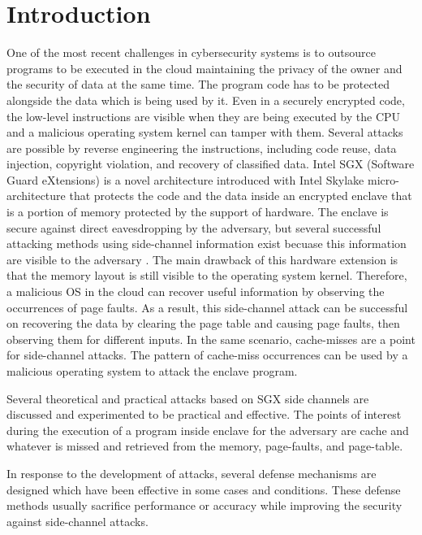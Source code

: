 \section{Introduction}

One of the most recent challenges in cybersecurity systems is to outsource programs to be executed in the cloud maintaining the privacy of the owner and the security of data at the same time. The program code has to be protected alongside the data which is being used by it. Even in a securely encrypted code, the low-level instructions are visible when they are being executed by the CPU and a malicious operating system kernel can tamper with them. Several attacks are possible by reverse engineering the instructions, including code reuse, data injection, copyright violation, and recovery of classified data. Intel SGX (Software Guard eXtensions) \cite{sgx} is a novel architecture introduced with Intel Skylake micro-architecture \cite{skylake} that protects the code and the data inside an encrypted enclave that is a portion of memory protected by the support of hardware. The enclave is secure against direct eavesdropping by the adversary, but several successful attacking methods using side-channel information exist becuase  this information are visible to the adversary \cite{leakycauldron}. The main drawback of this hardware extension is that the memory layout is still visible to the operating system kernel. Therefore, a malicious OS in the cloud can recover useful information by observing the occurrences of page faults. As a result, this side-channel attack can be successful on recovering the data by clearing the page table and causing page faults, then observing them for different inputs. In the same scenario, cache-misses are a point for side-channel attacks. The pattern of cache-miss occurrences can be used by a malicious operating system to attack the enclave program.

Several theoretical and practical attacks based on SGX side channels are discussed and experimented to be practical and effective. The points of interest during the execution of a program inside enclave for the adversary are cache and whatever is missed and retrieved from the memory, page-faults, and page-table.

In response to the development of attacks, several defense mechanisms are designed which have been effective in some cases and conditions. These defense methods usually sacrifice performance or accuracy while improving the security against side-channel attacks. 

